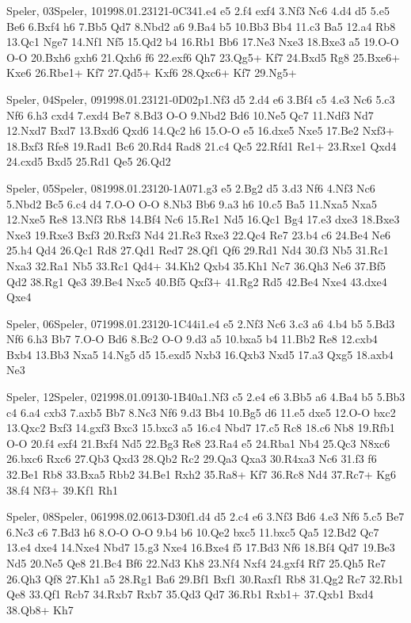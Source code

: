 \documentclass[twocolumn,a4paper,10pt]{report}
\begin{document}
\begin{chessgame}{Speler, 03}{Speler, 10}{1998.01.23}{12}{1-0}{C34}{1.e4 e5 2.f4 exf4 3.Nf3 Nc6 4.d4 d5 5.e5 Be6 6.Bxf4 h6 7.Bb5 Qd7 8.Nbd2 a6 9.Ba4 b5 10.Bb3 Bb4 11.c3 Ba5 12.a4 Rb8 13.Qc1 Nge7 14.Nf1 Nf5 15.Qd2 b4 16.Rb1 Bb6 17.Ne3 Nxe3 18.Bxe3 a5 19.O-O O-O 20.Bxh6 gxh6 21.Qxh6 f6 22.exf6 Qh7 23.Qg5+ Kf7 24.Bxd5 Rg8 25.Bxe6+ Kxe6 26.Rbe1+ Kf7 27.Qd5+ Kxf6 28.Qxc6+ Kf7 29.Ng5+}\end{chessgame}
\begin{chessgame}{Speler, 04}{Speler, 09}{1998.01.23}{12}{1-0}{D02p}{1.Nf3 d5 2.d4 e6 3.Bf4 c5 4.e3 Nc6 5.c3 Nf6 6.h3 cxd4 7.exd4 Be7 8.Bd3 O-O 9.Nbd2 Bd6 10.Ne5 Qc7 11.Ndf3 Nd7 12.Nxd7 Bxd7 13.Bxd6 Qxd6 14.Qc2 h6 15.O-O e5 16.dxe5 Nxe5 17.Be2 Nxf3+ 18.Bxf3 Rfe8 19.Rad1 Bc6 20.Rd4 Rad8 21.c4 Qc5 22.Rfd1 Re1+ 23.Rxe1 Qxd4 24.cxd5 Bxd5 25.Rd1 Qe5 26.Qd2}\end{chessgame}
\begin{chessgame}{Speler, 05}{Speler, 08}{1998.01.23}{12}{0-1}{A07}{1.g3 e5 2.Bg2 d5 3.d3 Nf6 4.Nf3 Nc6 5.Nbd2 Bc5 6.c4 d4 7.O-O O-O 8.Nb3 Bb6 9.a3 h6 10.c5 Ba5 11.Nxa5 Nxa5 12.Nxe5 Re8 13.Nf3 Rb8 14.Bf4 Nc6 15.Re1 Nd5 16.Qc1 Bg4 17.e3 dxe3 18.Bxe3 Nxe3 19.Rxe3 Bxf3 20.Rxf3 Nd4 21.Re3 Rxe3 22.Qc4 Re7 23.b4 c6 24.Be4 Ne6 25.h4 Qd4 26.Qc1 Rd8 27.Qd1 Red7 28.Qf1 Qf6 29.Rd1 Nd4 30.f3 Nb5 31.Rc1 Nxa3 32.Ra1 Nb5 33.Rc1 Qd4+ 34.Kh2 Qxb4 35.Kh1 Nc7 36.Qh3 Ne6 37.Bf5 Qd2 38.Rg1 Qe3 39.Be4 Nxc5 40.Bf5 Qxf3+ 41.Rg2 Rd5 42.Be4 Nxe4 43.dxe4 Qxe4}\end{chessgame}
\begin{chessgame}{Speler, 06}{Speler, 07}{1998.01.23}{12}{0-1}{C44i}{1.e4 e5 2.Nf3 Nc6 3.c3 a6 4.b4 b5 5.Bd3 Nf6 6.h3 Bb7 7.O-O Bd6 8.Bc2 O-O 9.d3 a5 10.bxa5 b4 11.Bb2 Re8 12.cxb4 Bxb4 13.Bb3 Nxa5 14.Ng5 d5 15.exd5 Nxb3 16.Qxb3 Nxd5 17.a3 Qxg5 18.axb4 Ne3}\end{chessgame}
\begin{chessgame}{Speler, 12}{Speler, 02}{1998.01.09}{13}{0-1}{B40a}{1.Nf3 c5 2.e4 e6 3.Bb5 a6 4.Ba4 b5 5.Bb3 c4 6.a4 cxb3 7.axb5 Bb7 8.Nc3 Nf6 9.d3 Bb4 10.Bg5 d6 11.e5 dxe5 12.O-O bxc2 13.Qxc2 Bxf3 14.gxf3 Bxc3 15.bxc3 a5 16.c4 Nbd7 17.c5 Rc8 18.c6 Nb8 19.Rfb1 O-O 20.f4 exf4 21.Bxf4 Nd5 22.Bg3 Re8 23.Ra4 e5 24.Rba1 Nb4 25.Qc3 N8xc6 26.bxc6 Rxc6 27.Qb3 Qxd3 28.Qb2 Rc2 29.Qa3 Qxa3 30.R4xa3 Nc6 31.f3 f6 32.Be1 Rb8 33.Bxa5 Rbb2 34.Be1 Rxh2 35.Ra8+ Kf7 36.Rc8 Nd4 37.Rc7+ Kg6 38.f4 Nf3+ 39.Kf1 Rh1\mate}\end{chessgame}
\begin{chessgame}{Speler, 08}{Speler, 06}{1998.02.06}{13}{\textonehalf-\textonehalf}{D30f}{1.d4 d5 2.c4 e6 3.Nf3 Bd6 4.e3 Nf6 5.c5 Be7 6.Nc3 c6 7.Bd3 h6 8.O-O O-O 9.b4 b6 10.Qe2 bxc5 11.bxc5 Qa5 12.Bd2 Qc7 13.e4 dxe4 14.Nxe4 Nbd7 15.g3 Nxe4 16.Bxe4 f5 17.Bd3 Nf6 18.Bf4 Qd7 19.Be3 Nd5 20.Ne5 Qe8 21.Bc4 Bf6 22.Nd3 Kh8 23.Nf4 Nxf4 24.gxf4 Rf7 25.Qh5 Re7 26.Qh3 Qf8 27.Kh1 a5 28.Rg1 Ba6 29.Bf1 Bxf1 30.Raxf1 Rb8 31.Qg2 Rc7 32.Rb1 Qe8 33.Qf1 Rcb7 34.Rxb7 Rxb7 35.Qd3 Qd7 36.Rb1 Rxb1+ 37.Qxb1 Bxd4 38.Qb8+ Kh7}\end{chessgame}
\end{document}
